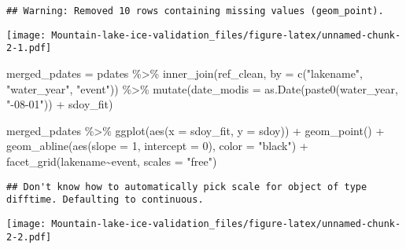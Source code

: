\documentclass[
]{article}
\newenvironment{Shaded}{\begin{snugshade}}{\end{snugshade}}
\newcommand{\AttributeTok}[1]{\textcolor[rgb]{0.77,0.63,0.00}{#1}}
\newcommand{\DecValTok}[1]{\textcolor[rgb]{0.00,0.00,0.81}{#1}}
\newcommand{\FunctionTok}[1]{\textcolor[rgb]{0.00,0.00,0.00}{#1}}
\newcommand{\NormalTok}[1]{#1}
\newcommand{\OtherTok}[1]{\textcolor[rgb]{0.56,0.35,0.01}{#1}}
\newcommand{\SpecialCharTok}[1]{\textcolor[rgb]{0.00,0.00,0.00}{#1}}
\newcommand{\StringTok}[1]{\textcolor[rgb]{0.31,0.60,0.02}{#1}}
\begin{document}
\begin{verbatim}
## Warning: Removed 10 rows containing missing values (geom_point).
\end{verbatim}

\texttt{[image: Mountain-lake-ice-validation\_files/figure-latex/unnamed-chunk-2-1.pdf]}

\begin{Shaded}
\begin{Highlighting}[]
\NormalTok{merged\_pdates }\OtherTok{=}\NormalTok{ pdates }\SpecialCharTok{\%\textgreater{}\%} 
  \FunctionTok{inner\_join}\NormalTok{(ref\_clean, }\AttributeTok{by =} \FunctionTok{c}\NormalTok{(}\StringTok{"lakename"}\NormalTok{, }\StringTok{"water\_year"}\NormalTok{, }\StringTok{"event"}\NormalTok{)) }\SpecialCharTok{\%\textgreater{}\%} 
  \FunctionTok{mutate}\NormalTok{(}\AttributeTok{date\_modis =} \FunctionTok{as.Date}\NormalTok{(}\FunctionTok{paste0}\NormalTok{(water\_year, }\StringTok{"{-}08{-}01"}\NormalTok{)) }\SpecialCharTok{+}\NormalTok{ sdoy\_fit)}

\NormalTok{merged\_pdates }\SpecialCharTok{\%\textgreater{}\%} 
  \FunctionTok{ggplot}\NormalTok{(}\FunctionTok{aes}\NormalTok{(}\AttributeTok{x =}\NormalTok{ sdoy\_fit, }\AttributeTok{y =}\NormalTok{ sdoy)) }\SpecialCharTok{+}
  \FunctionTok{geom\_point}\NormalTok{() }\SpecialCharTok{+}
  \FunctionTok{geom\_abline}\NormalTok{(}\FunctionTok{aes}\NormalTok{(}\AttributeTok{slope =} \DecValTok{1}\NormalTok{, }\AttributeTok{intercept =} \DecValTok{0}\NormalTok{), }\AttributeTok{color =} \StringTok{"black"}\NormalTok{) }\SpecialCharTok{+}
  \FunctionTok{facet\_grid}\NormalTok{(lakename}\SpecialCharTok{\textasciitilde{}}\NormalTok{event, }\AttributeTok{scales =} \StringTok{"free"}\NormalTok{)}
\end{Highlighting}
\end{Shaded}

\begin{verbatim}
## Don't know how to automatically pick scale for object of type difftime. Defaulting to continuous.
\end{verbatim}

\texttt{[image: Mountain-lake-ice-validation\_files/figure-latex/unnamed-chunk-2-2.pdf]}
\end{document}
